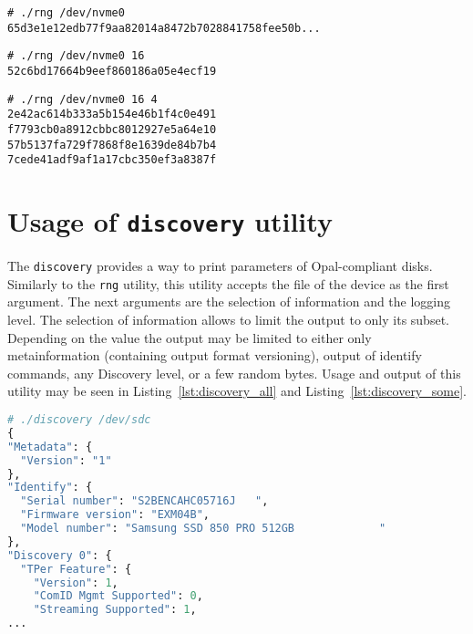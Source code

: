 \begin{lstlisting}[caption=Execution with default arguments,label={lst:rng_def}]
# ./rng /dev/nvme0
65d3e1e12edb77f9aa82014a8472b7028841758fee50b...
\end{lstlisting}

\begin{lstlisting}[caption=Execution specifying number of bytes per session,label={lst:rng_one}]
# ./rng /dev/nvme0 16
52c6bd17664b9eef860186a05e4ecf19
\end{lstlisting}

\newpage

\begin{lstlisting}[caption=Execution specifying number of sessions,label={lst:rng_two}]
# ./rng /dev/nvme0 16 4
2e42ac614b333a5b154e46b1f4c0e491
f7793cb0a8912cbbc8012927e5a64e10
57b5137fa729f7868f8e1639de84b7b4
7cede41adf9af1a17cbc350ef3a8387f
\end{lstlisting}



\section{Usage of \texttt{discovery} utility}

The \verb|discovery| provides a way to print parameters of Opal-compliant disks. Similarly to the \verb|rng| utility, this utility accepts the file of the device as the first argument. The next arguments are the selection of information and the logging level. The selection of information allows to limit the output to only its subset. Depending on the value the output may be limited to either only metainformation (containing output format versioning), output of identify commands, any Discovery level, or a few random bytes. Usage and output of this utility may be seen in Listing~\ref{lst:discovery_all} and Listing~\ref{lst:discovery_some}.




\begin{lstlisting}[language=python,caption=Execution providing entire output,label={lst:discovery_all}]
# ./discovery /dev/sdc
{
"Metadata": {
  "Version": "1"
},
"Identify": {
  "Serial number": "S2BENCAHC05716J   ",
  "Firmware version": "EXM04B",
  "Model number": "Samsung SSD 850 PRO 512GB             "
},
"Discovery 0": {
  "TPer Feature": {
    "Version": 1,
    "ComID Mgmt Supported": 0,
    "Streaming Supported": 1,
...
\end{lstlisting}
% 

